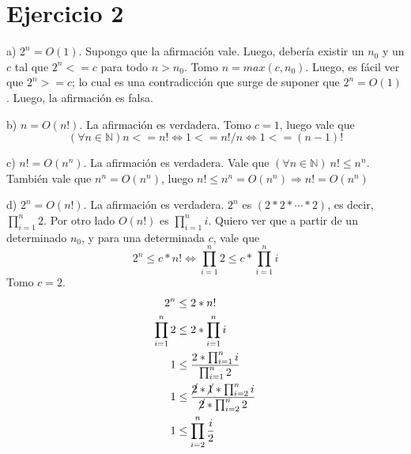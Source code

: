 \documentclass[11pt, spanish]{article}
\begin{document}
\section*{Ejercicio 2}

a) $2^n = O(1)$. Supongo que la afirmación vale. Luego, debería existir un $n_0$ y un $c$ tal que $2^n <= c$ para todo $n>n_0$. Tomo $n=max(c,n_0)$. Luego, es fácil ver que $2^{n} >= c$; lo cual es una contradicción que surge de suponer que $2^n = O(1)$. Luego, la afirmación es falsa.

\vspace{1em}
b) $n = O(n!)$.
La afirmación es verdadera. Tomo $c=1$, luego vale que 
\[
(\forall n \in \mathbb{N}) n <= n! \iff 1 <= n!/n \iff 1 <= (n-1)!
\]

\vspace{1em}
c) $n! = O(n^n)$.
La afirmación es verdadera. Vale que $(\forall n \in \mathbb{N})\ n! \leq n^n$. También vale que $n^n = O(n^n)$, luego $n! \leq n^n = O(n^n) \Rightarrow n! = O(n^n)$

\vspace{1em}
d) $2^n = O(n!)$. La afirmación es verdadera. $2^n$ es $(2 * 2 * \cdots * 2)$, es decir, $\prod_{i=1}^{n}2$. Por otro lado $O(n!)$ es $\prod_{i=1}^{n}i$. Quiero ver que a partir de un determinado $n_0$, y para una determinada $c$, vale que \[
2^n \leq c*n! \iff \prod_{i=1}^{n}2 \leq c*\prod_{i=1}^{n}i
\]
Tomo $c=2$.
\begin{equation*}\begin{split}
2^n &\leq 2*n!\\
\prod_{i=1}^{n}2 &\leq 2*\prod_{i=1}^{n}i\\
1 &\leq \frac{2*\prod_{i=1}^{n}i}{\prod_{i=1}^{n}2}\\
1 &\leq \frac{\cancel{2}*\cancel{1}*\prod_{i=2}^{n}i}{\cancel{2}* \prod_{i=2}^{n}2}\\
1 &\leq \prod_{i=2}^{n}{\frac{i}{2}}\\
\end{split}\end{equation*}
\end{document}

